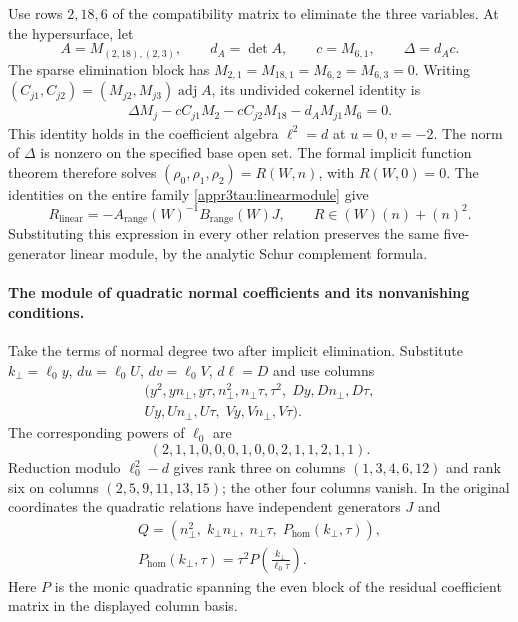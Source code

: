 \documentclass[11pt,a4paper]{article}
\numberwithin{equation}{section}
\theoremstyle{plain}
\theoremstyle{definition}
\theoremstyle{remark}
\begin{document}
Use rows $2,18,6$ of the compatibility matrix to eliminate the three variables. At the
hypersurface, let
\[
 A=M_{(2,18),(2,3)},\qquad d_A=\det A,\qquad
 c=M_{6,1},\qquad \Delta=d_Ac.
\]
The sparse elimination block has
$M_{2,1}=M_{18,1}=M_{6,2}=M_{6,3}=0$.
Writing $(C_{j1},C_{j2})=(M_{j2},M_{j3})\operatorname{adj}A$, its
undivided cokernel identity is
\begin{equation}\label{appr3tau:rangeidentity}
 \begin{aligned}
 \Delta M_j-cC_{j1}M_2-cC_{j2}M_{18}
              -d_AM_{j1}M_6=0 .
 \end{aligned}
\end{equation}
This identity holds in the coefficient algebra $\ell^2=d$ at
$u=0,v=-2$. The norm of $\Delta$ is nonzero on the specified base
open set.  The formal implicit function theorem therefore solves
$(\rho_0,\rho_1,\rho_2)=R(W,n)$, with $R(W,0)=0$.  The identities on the entire family
\eqref{appr3tau:linearmodule} give
\[
 R_{\mathrm{linear}}=-A_{\mathrm{range}}(W)^{-1}B_{\mathrm{range}}(W)J,
 \qquad R\in(W)(n)+(n)^2.
\]
Substituting this expression in every other relation preserves the same
five-generator linear module, by the analytic Schur complement formula.

\paragraph{The module of quadratic normal coefficients and its nonvanishing conditions.}
Take the terms of normal degree two after implicit elimination.
Substitute
$k_\perp=\ell_0 y$, $du=\ell_0 U$, $dv=\ell_0 V$, $d\ell=D$ and use columns
\[
 \begin{gathered}
 (y^2,yn_\perp,y\tau,n_\perp^2,n_\perp\tau,\tau^2,\;
   Dy,Dn_\perp,D\tau,\\
   Uy,Un_\perp,U\tau,\;Vy,Vn_\perp,V\tau).
 \end{gathered}
\]
The corresponding powers of $\ell_0$ are
\[
 (2,1,1,0,0,0,1,0,0,2,1,1,2,1,1).
\]
Reduction modulo $\ell_0^2-d$ gives rank three on columns
$(1,3,4,6,12)$ and rank six on columns $(2,5,9,11,13,15)$;
the other four columns vanish. In the original coordinates the
quadratic relations have independent generators $J$ and
\begin{equation}\label{appr3tau:Q}
 \begin{gathered}
 Q=(n_\perp^2,\;k_\perp n_\perp,\;n_\perp\tau,\;P_{\mathrm{hom}}(k_\perp,\tau)),\\
 P_{\mathrm{hom}}(k_\perp,\tau)=\tau^2P\left(\frac{k_\perp}{\ell_0\tau}\right).
 \end{gathered}
\end{equation}
Here $P$ is the monic quadratic spanning the even block of the
residual coefficient matrix in the displayed column basis.
\end{document}
